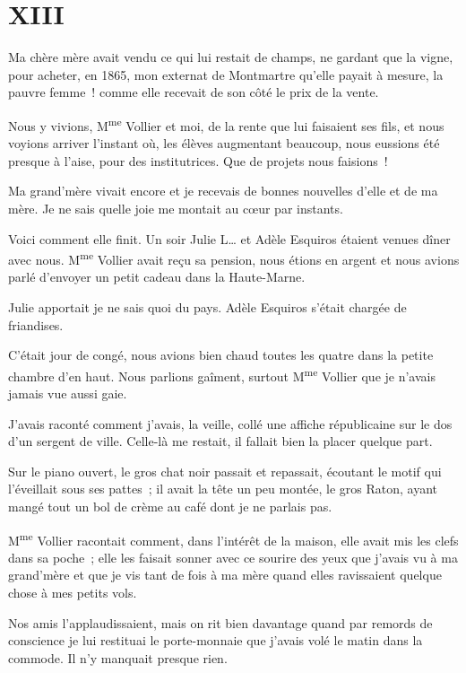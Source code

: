 \documentclass[french,twoside]{book} %
\newcommand\chapteropen{} %
\newcommand\chaptercont{} %
\begin{document}
\chapteropen
 \chapter[{XIII}]{XIII}
\label{p1.13}

\chaptercont
\noindent Ma chère mère avait vendu ce qui lui restait de champs, ne gardant que la vigne, pour acheter, en 1865, mon externat de Montmartre qu’elle payait à mesure, la pauvre femme ! comme elle recevait de son côté le prix de la vente.\par
Nous y vivions, M\textsuperscript{me} Vollier et moi, de la rente que lui faisaient ses fils, et nous voyions arriver l’instant où, les élèves augmentant beaucoup, nous eussions été presque à l’aise, pour des institutrices. Que de projets nous faisions !\par
Ma grand’mère vivait encore et je recevais de bonnes nouvelles d’elle et de ma mère. Je ne sais quelle joie me montait au cœur par instants.\par
Voici comment elle finit. Un soir Julie L… et Adèle Esquiros étaient venues dîner avec nous. M\textsuperscript{me} Vollier avait reçu sa pension, nous étions en argent et nous avions parlé d’envoyer un petit cadeau dans la Haute-Marne.\par
 Julie apportait je ne sais quoi du pays. Adèle Esquiros s’était chargée de friandises.\par
C’était jour de congé, nous avions bien chaud toutes les quatre dans la petite chambre d’en haut. Nous parlions gaîment, surtout M\textsuperscript{me} Vollier que je n’avais jamais vue aussi gaie.\par
J’avais raconté comment j’avais, la veille, collé une affiche républicaine sur le dos d’un sergent de ville. Celle-là me restait, il fallait bien la placer quelque part.\par
Sur le piano ouvert, le gros chat noir passait et repassait, écoutant le motif qui l’éveillait sous ses pattes ; il avait la tête un peu montée, le gros Raton, ayant mangé tout un bol de crème au café dont je ne parlais pas.\par
M\textsuperscript{me} Vollier racontait comment, dans l’intérêt de la maison, elle avait mis les clefs dans sa poche ; elle les faisait sonner avec ce sourire des yeux que j’avais vu à ma grand’mère et que je vis tant de fois à ma mère quand elles ravissaient quelque chose à mes petits vols.\par
Nos amis l’applaudissaient, mais on rit bien davantage quand par remords de conscience je lui restituai le porte-monnaie que j’avais volé le matin dans la commode. Il n’y manquait presque rien.\par
\end{document}
